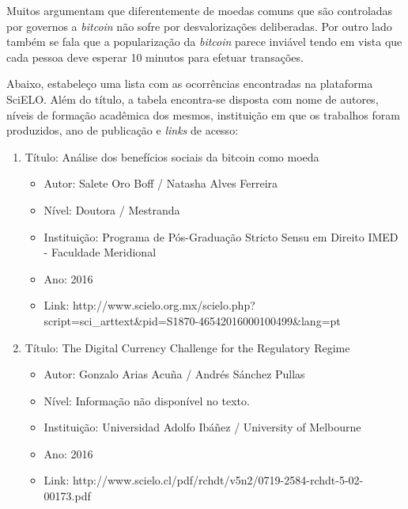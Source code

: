 \documentclass[12pt]{article}
\begin{document}
Muitos argumentam que diferentemente de moedas comuns que são controladas por governos a \textit{bitcoin} não sofre por desvalorizações deliberadas. Por outro lado também se fala que a popularização da \textit{bitcoin} parece inviável tendo em vista que cada pessoa deve esperar 10 minutos para efetuar transações.


Abaixo, estabeleço uma lista com as ocorrências encontradas na plataforma SciELO. Além do título, a tabela encontra-se disposta com nome de autores, níveis de formação acadêmica dos mesmos, instituição em que os trabalhos foram produzidos, ano de publicação e \textit{links} de acesso:

\begin{enumerate}[I]

\item Título: Análise dos benefícios sociais da bitcoin como moeda

\begin{itemize}

\item Autor: Salete Oro Boff / Natasha Alves Ferreira

\item Nível: Doutora / Mestranda

\item Instituição: Programa de Pós-Graduação Stricto Sensu em Direito IMED - Faculdade Meridional

\item Ano: 2016

\item Link: http://www.scielo.org.mx/scielo.php?script=sci\_arttext\&pid=S1870-46542016000100499\&lang=pt

\end{itemize}


\item Título: The Digital Currency Challenge for the Regulatory Regime
\begin{itemize}

\item Autor: 
Gonzalo Arias Acuña / Andrés Sánchez Pullas
\item Nível: Informação não disponível no texto.
\item Instituição: Universidad Adolfo Ibáñez / University of Melbourne
\item Ano: 
2016
\item Link: 
http://www.scielo.cl/pdf/rchdt/v5n2/0719-2584-rchdt-5-02-00173.pdf
\end{itemize}



\end{enumerate}
\end{document}
